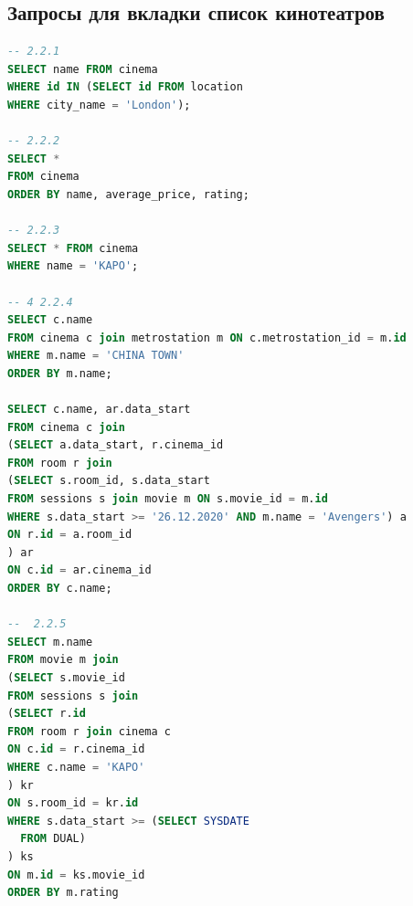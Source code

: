 \documentclass[a4paper,16pt]{article}
\begin{document}
\subsection{Запросы для вкладки список кинотеатров}
\begin{lstlisting}[language=SQL]
-- 2.2.1
SELECT name FROM cinema
WHERE id IN (SELECT id FROM location
WHERE city_name = 'London');

-- 2.2.2
SELECT *
FROM cinema
ORDER BY name, average_price, rating;

-- 2.2.3
SELECT * FROM cinema
WHERE name = 'KAPO';

-- 4 2.2.4
SELECT c.name
FROM cinema c join metrostation m ON c.metrostation_id = m.id
WHERE m.name = 'CHINA TOWN'
ORDER BY m.name;

SELECT c.name, ar.data_start
FROM cinema c join
(SELECT a.data_start, r.cinema_id
FROM room r join
(SELECT s.room_id, s.data_start
FROM sessions s join movie m ON s.movie_id = m.id
WHERE s.data_start >= '26.12.2020' AND m.name = 'Avengers') a
ON r.id = a.room_id
) ar
ON c.id = ar.cinema_id
ORDER BY c.name;

--  2.2.5
SELECT m.name
FROM movie m join
(SELECT s.movie_id
FROM sessions s join
(SELECT r.id
FROM room r join cinema c
ON c.id = r.cinema_id
WHERE c.name = 'KAPO'
) kr
ON s.room_id = kr.id
WHERE s.data_start >= (SELECT SYSDATE
  FROM DUAL)
) ks
ON m.id = ks.movie_id
ORDER BY m.rating
\end{lstlisting}
\end{document}
